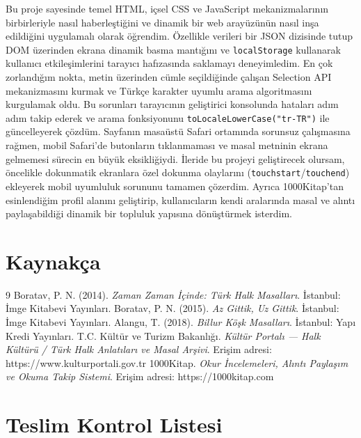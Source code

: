 \documentclass[12pt,a4paper]{article}
\begin{document}
Bu proje sayesinde temel HTML, içsel CSS ve JavaScript mekanizmalarının birbirleriyle nasıl haberleştiğini ve dinamik bir web arayüzünün nasıl inşa edildiğini uygulamalı olarak öğrendim. Özellikle verileri bir JSON dizisinde tutup DOM üzerinden ekrana dinamik basma mantığını ve \texttt{localStorage} kullanarak kullanıcı etkileşimlerini tarayıcı hafızasında saklamayı deneyimledim. En çok zorlandığım nokta, metin üzerinden cümle seçildiğinde çalışan Selection API mekanizmasını kurmak ve Türkçe karakter uyumlu arama algoritmasını kurgulamak oldu. Bu sorunları tarayıcının geliştirici konsolunda hataları adım adım takip ederek ve arama fonksiyonunu \texttt{toLocaleLowerCase("tr-TR")} ile güncelleyerek çözdüm. Sayfanın masaüstü Safari ortamında sorunsuz çalışmasına rağmen, mobil Safari'de butonların tıklanmaması ve masal metninin ekrana gelmemesi sürecin en büyük eksikliğiydi. İleride bu projeyi geliştirecek olursam, öncelikle dokunmatik ekranlara özel dokunma olaylarını (\texttt{touchstart}/\texttt{touchend}) ekleyerek mobil uyumluluk sorununu tamamen çözerdim. Ayrıca 1000Kitap'tan esinlendiğim profil alanını geliştirip, kullanıcıların kendi aralarında masal ve alıntı paylaşabildiği dinamik bir topluluk yapısına dönüştürmek isterdim.
\section{Kaynakça}

\begin{thebibliography}{9}
 Boratav, P. N. (2014). \emph{Zaman Zaman İçinde: Türk Halk Masalları}. İstanbul: İmge Kitabevi Yayınları.
 Boratav, P. N. (2015). \emph{Az Gittik, Uz Gittik}. İstanbul: İmge Kitabevi Yayınları.
 Alangu, T. (2018). \emph{Billur Köşk Masalları}. İstanbul: Yapı Kredi Yayınları.
 T.C. Kültür ve Turizm Bakanlığı. \emph{Kültür Portalı --- Halk Kültürü / Türk Halk Anlatıları ve Masal Arşivi}. Erişim adresi: https://www.kulturportali.gov.tr
 1000Kitap. \emph{Okur İncelemeleri, Alıntı Paylaşım ve Okuma Takip Sistemi}. Erişim adresi: https://1000kitap.com
\end{thebibliography}

\appendix
\section{Teslim Kontrol Listesi}
\end{document}
